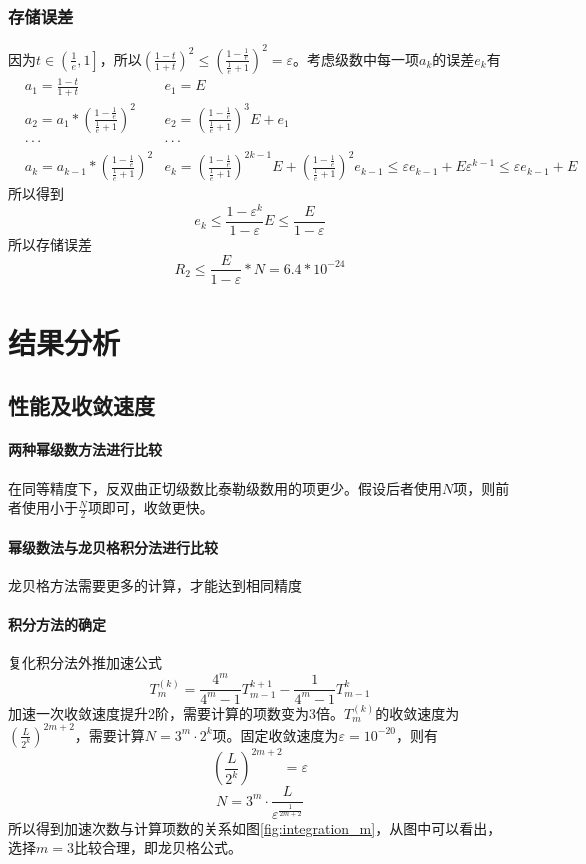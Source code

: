 \documentclass[UTF8,twocolum,titlepage]{ctexart}
\begin{document}
\subsubsection*{存储误差}
因为$t\in\left(\frac{1}{e},1\right]$，所以$\left(\frac{1-t}{1+t}\right)^2 \le \left(\frac{1-\frac{1}{e}}{\frac{1}{e}+1}\right)^2=\varepsilon$。考虑级数中每一项$a_k$的误差$e_k$有
\begin{eqnarray*}
&a_1=\frac{1-t}{1+t} &e_1=E\\
&a_2=a_1*\left(\frac{1-\frac{1}{e}}{\frac{1}{e}+1}\right)^2 &e_2=\left(\frac{1-\frac{1}{e}}{\frac{1}{e}+1}\right)^3E+e_1\\
&\cdot\cdot\cdot&\cdot\cdot\cdot\\
&a_k=a_{k-1}*\left(\frac{1-\frac{1}{e}}{\frac{1}{e}+1}\right)^2 &e_k=\left(\frac{1-\frac{1}{e}}{\frac{1}{e}+1}\right)^{2k-1}E+\left(\frac{1-\frac{1}{e}}{\frac{1}{e}+1}\right)^2e_{k-1} \le \varepsilon e_{k-1}+E\varepsilon^{k-1} \le \varepsilon e_{k-1}+E
\end{eqnarray*}
所以得到$$e_k \le \frac{1-\varepsilon^k}{1-\varepsilon}E \le \frac{E}{1-\varepsilon}$$所以存储误差$$R_2 \le \frac{E}{1-\varepsilon}*N=6.4*10^{-24}$$
\section*{结果分析}
\subsection*{性能及收敛速度}
\paragraph{两种幂级数方法进行比较}
在同等精度下，反双曲正切级数比泰勒级数用的项更少。假设后者使用$N$项，则前者使用小于$\frac{N}{2}$项即可，收敛更快。
\paragraph{幂级数法与龙贝格积分法进行比较}
龙贝格方法需要更多的计算，才能达到相同精度
\paragraph{积分方法的确定}
复化积分法外推加速公式\\
$$T_m^{(k)}=\frac{4^m}{4^m-1}T_{m-1}^{k+1}-\frac{1}{4^m-1}T_{m-1}^{k}$$
加速一次收敛速度提升2阶，需要计算的项数变为3倍。$T_m^{(k)}$的收敛速度为$\left(\frac{L}{2^k}\right)^{2m+2}$，需要计算$N=3^m\cdot2^k$项。固定收敛速度为$\varepsilon=10^{-20}$，则有$$\left(\frac{L}{2^k}\right)^{2m+2}=\varepsilon$$ $$N=3^m\cdot\frac{L}{\varepsilon^{\frac{1}{2m+2}}}$$所以得到加速次数与计算项数的关系如图\ref{fig:integration_m}，从图中可以看出，选择$m=3$比较合理，即龙贝格公式。
\newpage
\renewcommand\refname{参考文献}


\end{document}

